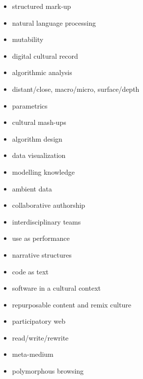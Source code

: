 \begin{multicols}{2}\raggedright
\begin{itemize}
  \item structured mark-up
  \item	natural language processing
  \item	mutability
  \item	digital cultural record
  \item	algorithmic analysis
  \item distant/close, macro/micro, surface/depth
  \item parametrics
  \item	cultural mash-ups
  \item	algorithm design
  \item data visualization
  \item	modelling knowledge
  \item	ambient data
  \item	collaborative authorship
  \item	interdisciplinary teams
  \item	use as performance
  \item narrative structures
  \item	code as text
  \item	software in a cultural context
  \item repurposable content and remix culture
  \item participatory web
  \item	read/write/rewrite
  \item	meta-medium
  \item	polymorphous browsing
\end{itemize}
\end{multicols}



